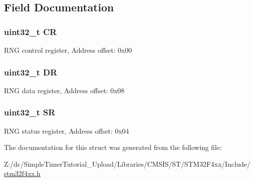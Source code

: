 \subsection{Field Documentation}
\hypertarget{struct_r_n_g___type_def_ab40c89c59391aaa9d9a8ec011dd0907a}{
\subsubsection[{C\-R}]{ uint32\-\_\-t C\-R}}\label{struct_r_n_g___type_def_ab40c89c59391aaa9d9a8ec011dd0907a}
R\-N\-G control register, Address offset\-: 0x00 \hypertarget{struct_r_n_g___type_def_a3df0d8dfcd1ec958659ffe21eb64fa94}{
\subsubsection[{D\-R}]{ uint32\-\_\-t D\-R}}\label{struct_r_n_g___type_def_a3df0d8dfcd1ec958659ffe21eb64fa94}
R\-N\-G data register, Address offset\-: 0x08 \hypertarget{struct_r_n_g___type_def_af6aca2bbd40c0fb6df7c3aebe224a360}{
\subsubsection[{S\-R}]{ uint32\-\_\-t S\-R}}\label{struct_r_n_g___type_def_af6aca2bbd40c0fb6df7c3aebe224a360}
R\-N\-G status register, Address offset\-: 0x04 

The documentation for this struct was generated from the following file\-:\begin{DoxyCompactItemize}
\item 
Z\-:/dc/\-Simple\-Timer\-Tutorial\-\_\-\-Upload/\-Libraries/\-C\-M\-S\-I\-S/\-S\-T/\-S\-T\-M32\-F4xx/\-Include/\hyperlink{stm32f4xx_8h}{stm32f4xx.\-h}\end{DoxyCompactItemize}
